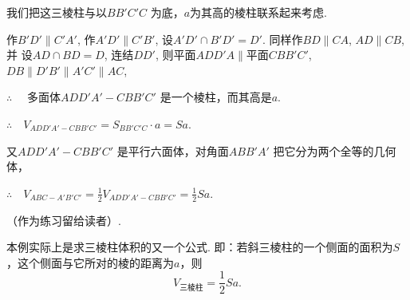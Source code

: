 \begin{figure}[htp]
    \centering
{}   
    \caption{}
\end{figure}


\begin{analyze}
我们把这三棱柱与以$BB'C'C$ 为底，$a$为其高的棱柱联系起来考虑.

作$B'D'\parallel C'A'$, 作$A'D' \parallel C'B'$, 设$A'D'\cap B'D'=D'$. 同样作$BD\parallel CA$, $AD\parallel CB$, 并
设$AD\cap BD=D$, 连结$DD'$, 则平面$ADD'A\parallel \text{平面} CBB'C'$,  $DB\parallel D'B'\parallel A'C'\parallel AC$,    

$\therefore\quad$ 多面体$ADD'A'-CBB'C'$ 是一个棱柱，而其高是$a$.

$\therefore\quad V_{ADD'A'-CBB'C'}=S_{BB'C'C}\cdot a=Sa$.

又$ADD'A'-CBB'C'$ 是平行六面体，对角面$ABB'A'$ 把它分为两个全等的几何体，

$\therefore\quad V_{ABC-A'B'C'}=\frac{1}{2}V_{ADD'A'-CBB'C'}=\frac{1}{2}Sa$.
\end{analyze}

\begin{solution}
    （作为练习留给读者）.
\end{solution}

\begin{remark}
    本例实际上是求三棱柱体积的又一个公式. 即：若斜三棱柱的一个侧面的面积为$S$，这个侧面与它所对的棱的距离为$a$，则
    \[V_{\text{三棱柱}}=\frac{1}{2}Sa.\]
\end{remark}

